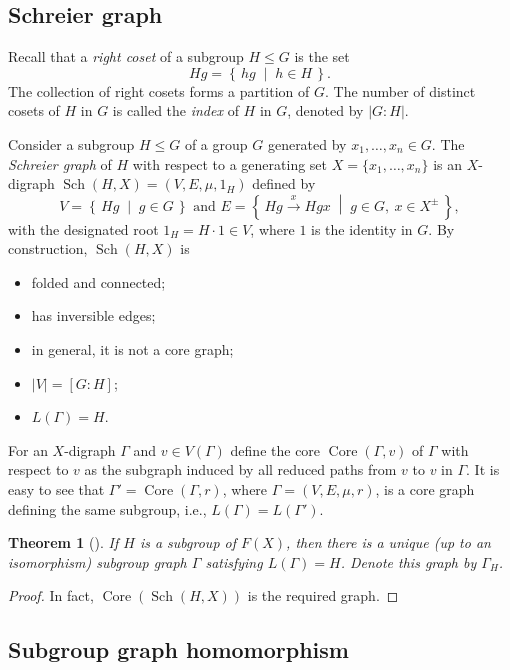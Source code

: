 \documentclass[12pt,oneside]{amsart}
\newtheorem{theorem}{Theorem}[section]
\theoremstyle{definition}
\theoremstyle{case}
\newcommand{\Set}[2]{\left\{\, #1 \;\middle|\; #2 \,\right\}}%
\DeclareMathOperator{\Core}{{Core}}
\DeclareMathOperator{\Sch}{{Sch}}
\begin{document}
\subsection{Schreier graph}

Recall that a \emph{right coset} of a subgroup $H\le G$ is the set
$$
Hg = \Set{hg}{h\in H}.
$$
The collection of right cosets forms a partition of $G$.
The number of distinct cosets of $H$ in $G$
is called the \emph{index} of $H$ in $G$, denoted by $|G:H|$.

Consider a subgroup $H\le G$ of a group $G$ generated by
$x_1,\dots,x_n\in G$.
The \emph{Schreier graph} of $H$ with respect to a generating set
$X=\{x_1,\dots,x_n\}$ 
is an $X$-digraph $\Sch(H,X)=(V,E,\mu,1_H)$ defined by
$$
V=\Set{Hg}{g\in G}
\mbox{ and }
E=\Set{Hg\stackrel{x}{\to}Hgx}{g\in G,\ x\in X^\pm},
$$
with the designated root $1_H=H\cdot 1\in V$, where $1$ is the
identity in $G$.
By construction, $\Sch(H,X)$ is 
\begin{itemize}
\item 
folded and connected;
\item 
has inversible edges;
\item 
in general, it is not a core graph;
\item 
$|V|=[G:H]$;
\item 
$L(\Gamma) = H$.
\end{itemize}

For an $X$-digraph $\Gamma$ and $v\in V(\Gamma)$ define
the core $\Core(\Gamma,v)$
of $\Gamma$ with respect to $v$ as the subgraph
induced by all reduced paths from $v$ to $v$ in $\Gamma$.
It is easy to see that
$\Gamma' = \Core(\Gamma,r)$, where $\Gamma=(V,E,\mu,r)$, is a core graph
defining the same subgroup, i.e., $L(\Gamma)=L(\Gamma')$.


\begin{theorem}[{{\cite[Theorem 5.1, Theorem 5.2, and Definition 5.3]{Kapovich_Miasnikov:2002}}}]
If $H$ is a subgroup of $F(X)$, then there is a unique 
(up to an isomorphism) subgroup graph $\Gamma$ satisfying 
$L(\Gamma) = H$.
Denote this graph by $\Gamma_H$.
\end{theorem}

\begin{proof}
In fact, $\Core(\Sch(H,X))$ is the required graph.
\end{proof}


\subsection{Subgroup graph homomorphism}
\end{document}
